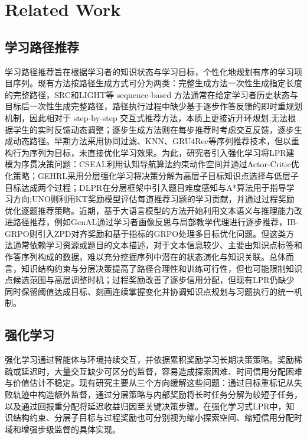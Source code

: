 \documentclass[11pt,a4paper]{article}
\begin{document}
\section{Related Work}
\subsection{学习路径推荐}
学习路径推荐旨在根据学习者的知识状态与学习目标，个性化地规划有序的学习项目序列\cite{nabizadeh2020learning}。现有方法按路径生成方式可分为两类：完整生成方法一次性生成指定长度的完整路径，SRC\cite{chen2023set}和LIGHT\cite{yu2025light}等 sequence-based 方法通常在给定学习者历史状态与目标后一次性生成完整路径，路径执行过程中缺少基于逐步作答反馈的即时重规划机制，因此相对于 step-by-step 交互式推荐方法，本质上更接近开环规划,无法根据学生的实时反馈动态调整；逐步生成方法则在每步推荐时考虑交互反馈，逐步生成动态路径。早期方法采用协同过滤、KNN、GRU4Rec等序列推荐技术\cite{cover1967nearest,hidasi2015session}，但以重构行为序列为目标，未直接优化学习效果。为此，研究者引入强化学习将LPR建模为序贯决策问题：CSEAL\cite{liu2019exploiting}利用认知导航算法约束动作空间并通过Actor-Critic\cite{sutton1999policy}优化策略；GEHRL\cite{li2023graph}采用分层强化学习将决策分解为高层子目标知识点选择与低层子目标达成两个过程；DLPR\cite{zhang2024item}在分层框架中引入题目难度感知与A*算法\cite{duchovn2014path}用于指导学习方向;UNO\cite{peng2026uno}则利用KT奖励模型评估每道推荐习题的学习贡献，并通过过程奖励优化逐题推荐策略。近期，基于大语言模型的方法开始利用文本语义与推理能力改进路径推荐，例如GenAL\cite{lv2025genal}通过学习者画像反思与局部教学代理进行逐步推荐，IB-GRPO\cite{wang2026ib}则引入ZPD对齐奖励和基于指标的GRPO处理多目标优化问题。但这类方法通常依赖学习资源或题目的文本描述，对于文本信息较少、主要由知识点标签和作答序列构成的数据，难以充分挖掘序列中潜在的状态演化与知识关联。总体而言，知识结构约束与分层决策提高了路径合理性和训练可行性，但也可能限制知识点候选范围与高层调整时机；过程奖励改善了逐步信用分配，但现有LPR仍缺少同时保留阈值达成目标、刻画连续掌握变化并协调知识点规划与习题执行的统一机制。

\subsection{强化学习}
强化学习通过智能体与环境持续交互，并依据累积奖励学习长期决策策略。奖励稀疏或延迟时，大量交互缺少可区分的监督，容易造成探索困难、时间信用分配困难与价值估计不稳定。现有研究主要从三个方向缓解这些问题：通过目标重标记从失败轨迹中构造额外监督\cite{andrychowicz2017hindsight}，通过分层策略与内部奖励将长时任务分解为较短子任务\cite{kulkarni2016hierarchical}，以及通过回报重分配将延迟收益归因至关键决策步骤\cite{arjona2019rudder}。在强化学习式LPR中，知识结构约束、分层子目标与过程奖励也可分别视为缩小探索空间、缩短信用分配时域和增强步级监督的具体实现\cite{liu2019exploiting,li2023graph,zhang2024item,peng2026uno}。
\end{document}
